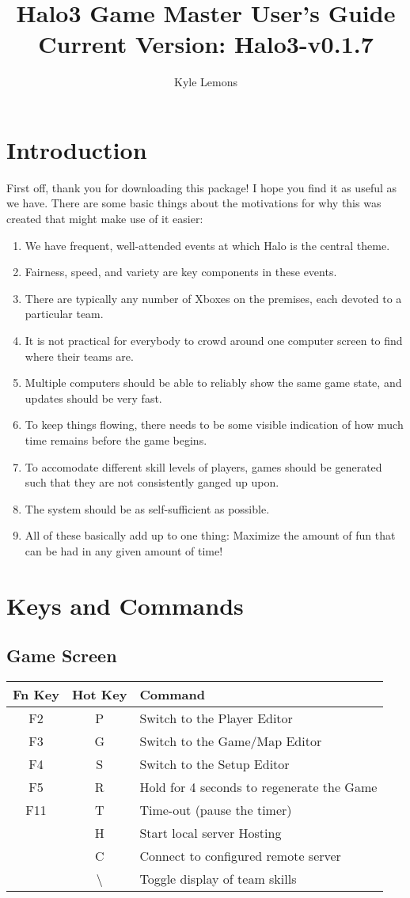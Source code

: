 \documentclass[10pt,a4paper]{report}
\author{Kyle Lemons}
\title{Halo3 Game Master User's Guide \\
{\large{Current Version: Halo3-v0.1.7}}}
\begin{document}
\maketitle
\tableofcontents
\pagebreak

\chapter{Introduction}
First off, thank you for downloading this package!  I hope you find it as useful as we have.
There are some basic things about the motivations for why this was created that might make use of it easier:
\begin{enumerate}
\item We have frequent, well-attended events at which Halo is the central theme.
\item Fairness, speed, and variety are key components in these events.
\item There are typically any number of Xboxes on the premises, each devoted to a particular team.
\item It is not practical for everybody to crowd around one computer screen to find where their teams are.
\item Multiple computers should be able to reliably show the same game state, and updates should be very fast.
\item To keep things flowing, there needs to be some visible indication of how much time remains before the game begins.
\item To accomodate different skill levels of players, games should be generated such that they are not consistently ganged up upon.
\item The system should be as self-sufficient as possible.
\item All of these basically add up to one thing: Maximize the amount of fun that can be had in any given amount of time!
\end{enumerate}

\chapter{Keys and Commands}
\section{Game Screen}
\begin{tabular}{c|c|l}
Fn Key & Hot Key & Command \\
\hline
F2 & P & Switch to the Player Editor \\
F3 & G & Switch to the Game/Map Editor \\
F4 & S & Switch to the Setup Editor \\
F5 & R & Hold for 4 seconds to regenerate the Game \\
F11 & T & Time-out (pause the timer) \\
& H & Start local server Hosting \\
& C & Connect to configured remote server \\
& \textbackslash & Toggle display of team skills \\
\end{tabular}
\end{document}
